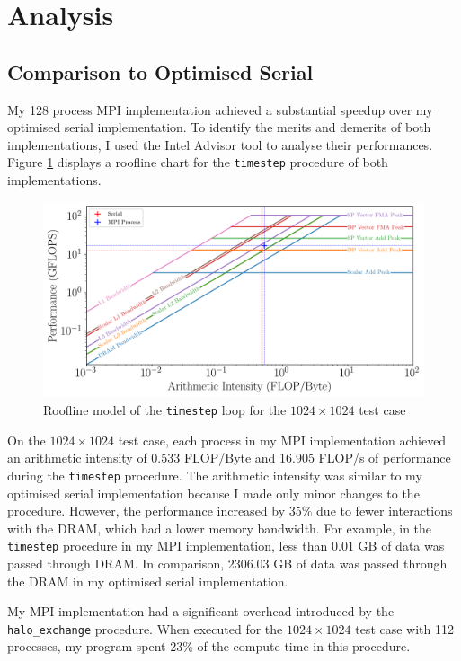 \documentclass[twocolumn, a4paper]{article}
\begin{document}
\section{Analysis}

\subsection{Comparison to Optimised Serial}

My 128 process MPI implementation achieved a substantial speedup over my optimised serial implementation.
To identify the merits and demerits of both implementations, I used the Intel Advisor tool to analyse their performances.
Figure \ref{fig:roofline} displays a roofline chart for the \texttt{timestep} procedure of both implementations.

\begin{figure}[htbp]
  \centering
  \includegraphics[width=\linewidth]{roofline.png}
  \caption{Roofline model of the \texttt{timestep} loop for the $1024\times1024$ test case}\label{fig:roofline}
\end{figure}

On the $1024 \times 1024$ test case, each process in my MPI implementation achieved an arithmetic intensity of 0.533 FLOP/Byte and 16.905 FLOP/s of performance during the \texttt{timestep} procedure.
The arithmetic intensity was similar to my optimised serial implementation because I made only minor changes to the procedure.
However, the performance increased by 35\% due to fewer interactions with the DRAM, which had a lower memory bandwidth.
For example, in the \texttt{timestep} procedure in my MPI implementation, less than 0.01 GB of data was passed through DRAM.
In comparison, 2306.03 GB of data was passed through the DRAM in my optimised serial implementation.

My MPI implementation had a significant overhead introduced by the \texttt{halo\_exchange} procedure.
When executed for the $1024\times1024$ test case with 112 processes, my program spent 23\% of the compute time in this procedure.
\end{document}
